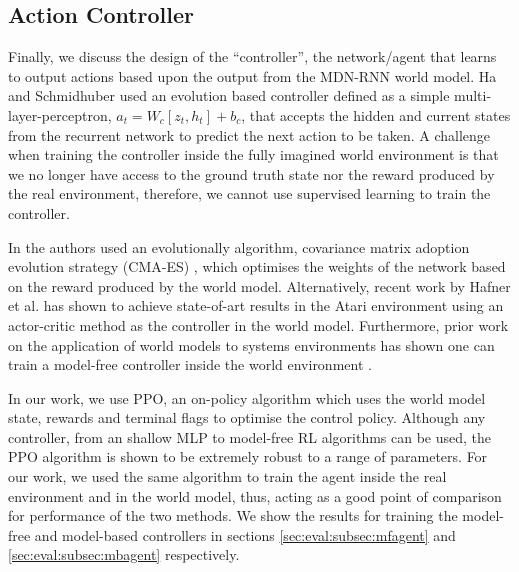 \subsection{Action Controller}
\label{sec:rlopt:subsec:actionctrl}

Finally, we discuss the design of the ``controller'', the network/agent that learns to output actions based upon the output from the MDN-RNN world model. Ha and Schmidhuber \cite{ha2018worldmodels} used an evolution based controller defined as a simple multi-layer-perceptron, $a_t = W_c[z_t, h_t] + b_c$, that accepts the hidden and current states from the recurrent network to predict the next action to be taken. A challenge when training the controller inside the fully imagined world environment is that we no longer have access to the ground truth state nor the reward produced by the real environment, therefore, we cannot use supervised learning to train the controller. 

In \cite{ha2018worldmodels} the authors used an evolutionally algorithm, covariance matrix adoption evolution strategy (CMA-ES) \cite{hansen2001completely, hansen2016cma}, which optimises the weights of the network based on the reward produced by the world model. Alternatively, recent work by Hafner et al. \cite{hafner2020dream, hafner2021mastering} has shown to achieve state-of-art results in the Atari environment using an actor-critic method as the controller in the world model. Furthermore, prior work on the application of world models to systems environments has shown one can train a model-free controller inside the world environment \cite{app10196685}.


In our work, we use PPO, an on-policy algorithm which uses the world model state, rewards and terminal flags to optimise the control policy. Although any controller, from an shallow MLP to model-free RL algorithms can be used, the PPO algorithm is shown to be extremely robust to a range of parameters. For our work, we used the same algorithm to train the agent inside the real environment and in the world model, thus, acting as a good point of comparison for performance of the two methods. We show the results for training the model-free and model-based controllers in sections \ref{sec:eval:subsec:mfagent} and \ref{sec:eval:subsec:mbagent} respectively.

% 